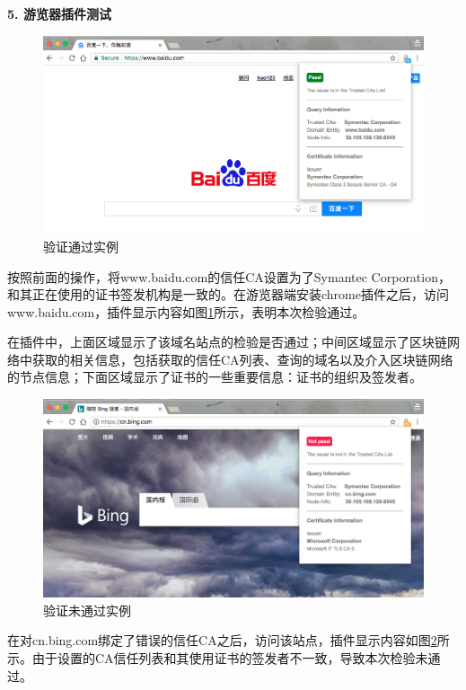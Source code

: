 \noindent\textbf{5. 游览器插件测试}

\begin{figure}[!htbp]
 	\centering
 	\includegraphics[scale=0.45]{img/pass}
 	\caption{验证通过实例}\label{fig:pass}
\end{figure}

按照前面的操作，将www.baidu.com的信任CA设置为了Symantec Corporation，和其正在使用的证书签发机构是一致的。在游览器端安装chrome插件之后，访问www.baidu.com，插件显示内容如图\ref{fig:pass}所示，表明本次检验通过。



在插件中，上面区域显示了该域名站点的检验是否通过；中间区域显示了区块链网络中获取的相关信息，包括获取的信任CA列表、查询的域名以及介入区块链网络的节点信息；下面区域显示了证书的一些重要信息：证书的组织及签发者。


\begin{figure}[!htbp]
 	\centering
 	\includegraphics[scale=0.45]{img/notPass}
 	\caption{验证未通过实例}\label{fig:notPass}
\end{figure}

在对cn.bing.com绑定了错误的信任CA之后，访问该站点，插件显示内容如图\ref{fig:notPass}所示。由于设置的CA信任列表和其使用证书的签发者不一致，导致本次检验未通过。




